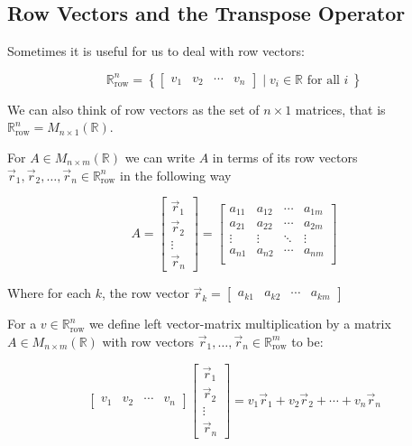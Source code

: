 

\clearpage

\subsection{Row Vectors and the Transpose Operator}

Sometimes it is useful for us to deal with row vectors:

$$
\mathbb{R}_\text{row}^n=\left\{ 
\begin{bmatrix}v_1 & v_2 & \cdots & v_n\end{bmatrix}
\mid v_i \in \mathbb{R} \text{ for all } i\ \right\}
$$

We can also think of row vectors as the set of $n \times 1 $ matrices, that is $\mathbb{R}^n_\text{row} = M_{n \times 1}(\mathbb{R})$.

For $A \in  M_{n \times m}(\mathbb{R})$ we can write $A$ in terms of its row vectors $\vec{r}_1, \vec{r}_2, \ldots, \vec{r}_n \in \mathbb{R}^n_\text{row}$ in the 
following way

$$
A=\begin{bmatrix}\vec{r}_1 \\ \vec{r}_2 \\ \vdots \\ \vec{r}_n \end{bmatrix}=
\begin{bmatrix}
a_{11} & a_{12} & \cdots & a_{1m} \\
a_{21} & a_{22} & \cdots & a_{2m} \\
\vdots & \vdots & \ddots & \vdots \\
a_{n1} & a_{n2} & \cdots & a_{nm} \\
\end{bmatrix}
$$

Where for each $k$, the row vector $\vec{r}_k=\begin{bmatrix}a_{k1} & a_{k2} & \cdots & a_{km}\end{bmatrix}$

For a $v \in \mathbb{R}_\text{row}^n$ we define left vector-matrix multiplication by a matrix $A\in M_{n \times m}(\mathbb{R})$ with row vectors 
$\vec{r}_1, \ldots, \vec{r}_n \in \mathbb{R}^m_\text{row}$ to be:


$$
\begin{bmatrix}v_1 & v_2 & \cdots & v_n\end{bmatrix}\begin{bmatrix}\vec{r}_1 \\ \vec{r}_2 \\ \vdots \\ \vec{r}_n\end{bmatrix}
=v_1\vec{r}_1+v_2\vec{r}_2+ \cdots + v_n\vec{r}_n 
$$

